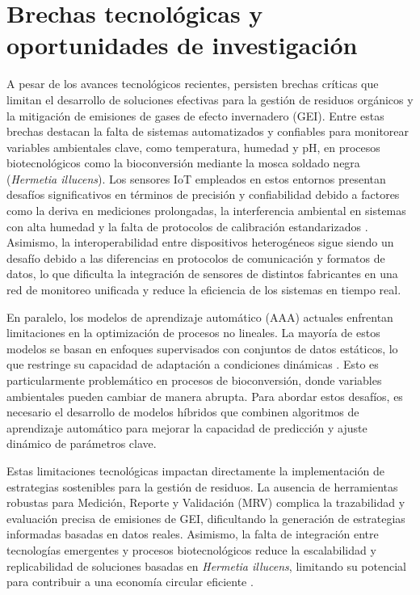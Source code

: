 \section{Brechas tecnológicas y oportunidades de investigación}

A pesar de los avances tecnológicos recientes, persisten brechas críticas que limitan el desarrollo de soluciones efectivas para la gestión de residuos orgánicos y la mitigación de emisiones de gases de efecto invernadero (GEI). Entre estas brechas destacan la falta de sistemas automatizados y confiables para monitorear variables ambientales clave, como temperatura, humedad y pH, en procesos biotecnológicos como la bioconversión mediante la mosca soldado negra (\textit{Hermetia illucens}). Los sensores IoT empleados en estos entornos presentan desafíos significativos en términos de precisión y confiabilidad debido a factores como la deriva en mediciones prolongadas, la interferencia ambiental en sistemas con alta humedad y la falta de protocolos de calibración estandarizados \parencite{kamilaris2017review,herrinCollateralDataQuality2021}. Asimismo, la interoperabilidad entre dispositivos heterogéneos sigue siendo un desafío debido a las diferencias en protocolos de comunicación y formatos de datos, lo que dificulta la integración de sensores de distintos fabricantes en una red de monitoreo unificada y reduce la eficiencia de los sistemas en tiempo real.

En paralelo, los modelos de aprendizaje automático (AAA) actuales enfrentan limitaciones en la optimización de procesos no lineales. La mayoría de estos modelos se basan en enfoques supervisados con conjuntos de datos estáticos, lo que restringe su capacidad de adaptación a condiciones dinámicas \parencite{herrinCollateralDataQuality2021}. Esto es particularmente problemático en procesos de bioconversión, donde variables ambientales pueden cambiar de manera abrupta. Para abordar estos desafíos, es necesario el desarrollo de modelos híbridos que combinen algoritmos de aprendizaje automático para mejorar la capacidad de predicción y ajuste dinámico de parámetros clave. 

Estas limitaciones tecnológicas impactan directamente la implementación de estrategias sostenibles para la gestión de residuos. La ausencia de herramientas robustas para Medición, Reporte y Validación (MRV) complica la trazabilidad y evaluación precisa de emisiones de GEI, dificultando la generación de estrategias informadas basadas en datos reales. Asimismo, la falta de integración entre tecnologías emergentes y procesos biotecnológicos reduce la escalabilidad y replicabilidad de soluciones basadas en \textit{Hermetia illucens}, limitando su potencial para contribuir a una economía circular eficiente \parencite{ahmedAgricultureClimateChange2020,vanIntegrationInternetofThingsSustainable2022}.

